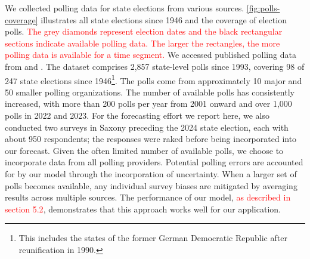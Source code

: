 \documentclass[12pt]{article}
\begin{document}
\begin{doublespacing}
We collected polling data for state elections from various sources. \autoref{fig:polls-coverage} illustrates all state elections since 1946 and the coverage of election polls. \textcolor{red}{The grey diamonds represent election dates and the black rectangular sections indicate available polling data. The larger the rectangles, the more polling data is available for a time segment.}
We accessed published polling data from \citet{dawum_state_polls} and \citet{wahlrecht_state_polls}. The dataset comprises 2,857 state-level polls since 1993, covering 98 of 247 state elections since 1946\footnote{This includes the states of the former German Democratic Republic after reunification in 1990.}. The polls come from approximately 10 major and 50 smaller polling organizations. The number of available polls has consistently increased, with more than 200 polls per year from 2001 onward and over 1,000 polls in 2022 and 2023. For the forecasting effort we report here, we also conducted two surveys in Saxony preceding the 2024 state election, each with about 950 respondents; the responses were raked before being incorporated into our forecast. Given the often limited number of available polls, we choose to incorporate data from all polling providers. Potential polling errors are accounted for by our model through the incorporation of uncertainty. 
When a larger set of polls becomes available, any individual survey biases are mitigated by averaging results across multiple sources. The  performance of our model, \textcolor{red}{as described in section 5.2}, demonstrates that this approach works well for our application.







\end{doublespacing}
\end{document}
